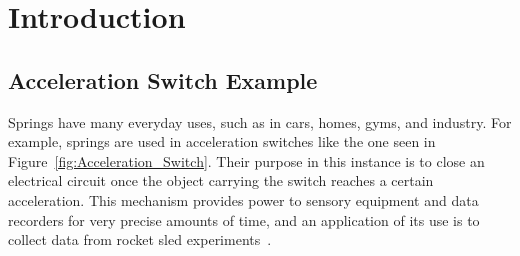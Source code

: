 \documentclass[10pt]{article}
\begin{document}
\section{Introduction}
\label{sec:Introduction}

\subsection{Acceleration Switch Example}
\label{subsec:Example}

Springs have many everyday uses, such as in cars, homes, gyms, and industry. For example, springs are used in acceleration switches like the one seen in Figure~\ref{fig:Acceleration_Switch}. Their purpose in this instance is to close an electrical circuit once the object carrying the switch reaches a certain acceleration. This mechanism provides power to sensory equipment and data recorders for very precise amounts of time, and an application of its use is to collect data from rocket sled experiments~\cite{Massad2015}. 
\end{document}
